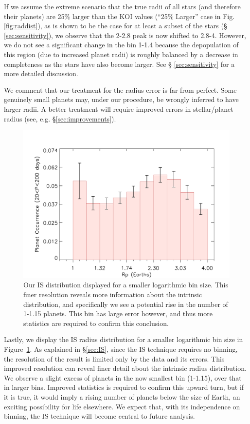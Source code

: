 If we assume the extreme scenario that the true radii of all
stars (and therefore their planets) are 25\% larger than the KOI
values (``25\% Larger'' case in Fig. \ref{fig:raddist}), as is shown
to be the case for at least a subset of the \kep{} stars (\S
\ref{sec:sensitivity}), we observe that the 2-2.8\rearth{} peak is now shifted to
2.8-4\rearth{}. However, we do not see a significant change in
the bin 1-1.4\rearth{} because the depopulation of this region 
(due to increased planet radii) is roughly balanced by a decrease
in completeness as the stars have also become larger. See \S
\ref{sec:sensitivity} for a more detailed discussion.

We comment that our treatment for the radius error is far from
perfect. Some genuinely small planets may, under our procedure, be
wrongly inferred to have larger radii. A better treatment will require
improved errors in stellar/planet radius (see, e.g. \S \ref{sec:improvements}).

\begin{figure}
\centerline{\includegraphics[scale=0.55]{chap2/Silburt_ISnobin.pdf}}
\caption{Our IS distribution displayed for a smaller logarithmic 
 bin size. This finer resolution reveals more information about
 the intrinsic distribution, and specifically we see a potential
 rise in the number of 1-1.15\rearth{} planets. This bin has large 
 error however, and thus more statistics are required to confirm this 
 conclusion.}
\label{fig:isnobin}
\end{figure}

Lastly, we display the IS radius distribution for a smaller
logarithmic bin size in Figure~\ref{fig:isnobin}. As explained in 
\S\ref{sec:IS}, since the IS technique requires no binning, the 
resolution of the result is limited only by the data and its errors. 
This improved resolution can reveal finer detail about the intrinsic 
radius distribution. We observe a slight excess of planets in the now 
smallest bin (1-1.15\rearth{}), over that in larger bins.
Improved statistics is required to confirm this upward turn, but
if it is true, it would imply a rising number of planets below the
size of Earth, an exciting possibility for life elsewhere.  We
expect that, with its independence on binning, the IS technique will
become central to future analysis.


